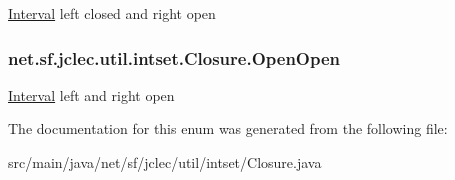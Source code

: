 \hyperlink{classnet_1_1sf_1_1jclec_1_1util_1_1intset_1_1_interval}{Interval} left closed and right open \hypertarget{enumnet_1_1sf_1_1jclec_1_1util_1_1intset_1_1_closure_afb6298f83e6ff0568ba2cd249c34017a}{
\subsubsection[{Open\-Open}]{\setlength{\rightskip}{0pt plus 5cm}net.\-sf.\-jclec.\-util.\-intset.\-Closure.\-Open\-Open}}\label{enumnet_1_1sf_1_1jclec_1_1util_1_1intset_1_1_closure_afb6298f83e6ff0568ba2cd249c34017a}
\hyperlink{classnet_1_1sf_1_1jclec_1_1util_1_1intset_1_1_interval}{Interval} left and right open 

The documentation for this enum was generated from the following file\-:\begin{DoxyCompactItemize}
\item 
src/main/java/net/sf/jclec/util/intset/Closure.\-java\end{DoxyCompactItemize}
